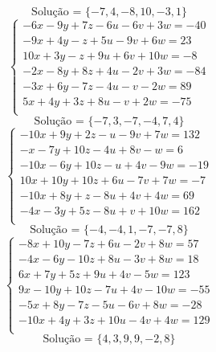 \documentclass[12pt,oneside,a4paper]{article}
\begin{document}
\begin{equation*}
\text{Solução = }\{-7,4,-8,10,-3,1\}
\end{equation*}
\vspace{\baselineskip}
\begin{equation*}
\begin{cases}
-6x-9y+7z-6u-6v+3w=-40 \\
-9x+4y-z+5u-9v+6w=23 \\
10x+3y-z+9u+6v+10w=-8 \\
-2x-8y+8z+4u-2v+3w=-84 \\
-3x+6y-7z-4u-v-2w=89 \\
5x+4y+3z+8u-v+2w=-75 \\
\end{cases}
\end{equation*}
\begin{equation*}
\text{Solução = }\{-7,3,-7,-4,7,4\}
\end{equation*}
\vspace{\baselineskip}
\begin{equation*}
\begin{cases}
-10x+9y+2z-u-9v+7w=132 \\
-x-7y+10z-4u+8v-w=6 \\
-10x-6y+10z-u+4v-9w=-19 \\
10x+10y+10z+6u-7v+7w=-7 \\
-10x+8y+z-8u+4v+4w=69 \\
-4x-3y+5z-8u+v+10w=162 \\
\end{cases}
\end{equation*}
\begin{equation*}
\text{Solução = }\{-4,-4,1,-7,-7,8\}
\end{equation*}
\vspace{\baselineskip}
\begin{equation*}
\begin{cases}
-8x+10y-7z+6u-2v+8w=57 \\
-4x-6y-10z+8u-3v+8w=18 \\
6x+7y+5z+9u+4v-5w=123 \\
9x-10y+10z-7u+4v-10w=-55 \\
-5x+8y-7z-5u-6v+8w=-28 \\
-10x+4y+3z+10u-4v+4w=129 \\
\end{cases}
\end{equation*}
\begin{equation*}
\text{Solução = }\{4,3,9,9,-2,8\}
\end{equation*}
\end{document}
